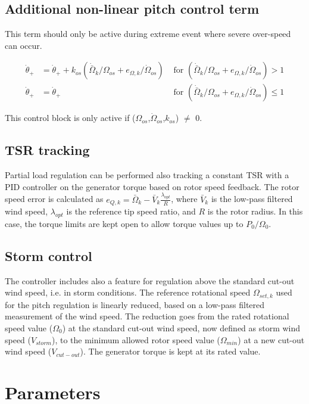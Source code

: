 \subsection{Additional non-linear pitch control term}

This term should only be active during extreme event where severe over-speed can occur.

\begin{align}
	\dot{\theta}_{+} &= \dot{\theta}_{+} + k_{os} ( \dot{\bar{\Omega}}_k/\Omega_{os} + e_{\Omega,k}/\dot{\Omega}_{os} ) &\text{ for } ( \dot{\bar{\Omega}}_k/\Omega_{os} + e_{\Omega,k}/\dot{\Omega}_{os} ) > 1 \\
	\dot{\theta}_{+} &= \dot{\theta}_{+} &\text{ for } ( \dot{\bar{\Omega}}_k/\Omega_{os} + e_{\Omega,k}/\dot{\Omega}_{os} ) \leq 1	
\end{align}

This control block is only active if ($\Omega_{os}$,$\dot{\Omega}_{os}$,$k_{os}$) $\neq$ 0.

\subsection{TSR tracking}
Partial load regulation can be performed also tracking a constant TSR with a PID controller on the generator torque based on rotor speed feedback. The rotor speed error is calculated as $e_{Q,k}=\bar\Omega_k -\bar V_k \frac{\lambda_{opt}}{R}$, where $\bar V_k$ is the low-pass filtered wind speed, $\lambda_{opt}$ is the reference tip speed ratio, and $R$ is the rotor radius. In this case, the torque limits are kept open to allow torque values up to  $P_0/\Omega_0$.

\subsection{Storm control}
The controller includes also a feature for regulation above the standard cut-out wind speed, i.e. in storm conditions. The reference rotational speed $\Omega_{set, k}$ used for the pitch regulation is linearly reduced, based on a low-pass filtered measurement of the wind speed. The reduction goes from the rated rotational speed value ($\Omega_0$) at the standard cut-out wind speed, now defined as storm wind speed ($V_{storm}$), to the minimum allowed rotor speed value ($\Omega_{min}$) at a new cut-out wind speed ($V_{cut-out}$). The generator torque is kept at its rated value.


\section{Parameters}
\label{s:par}

